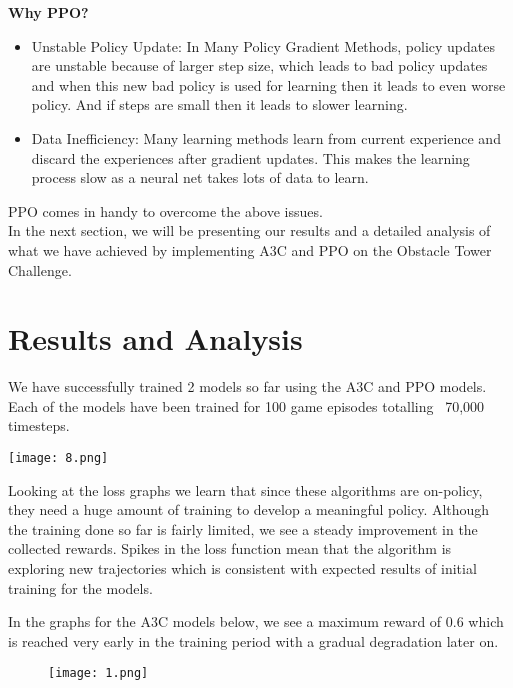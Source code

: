 \documentclass[conference]{IEEEtran}
\begin{document}
\textbf{Why PPO?}\\

\begin{itemize}
\item Unstable Policy Update: In Many Policy Gradient Methods, policy updates are unstable because of larger step size, which leads to bad policy updates and when this new bad policy is used for learning then it leads to even worse policy. And if steps are small then it leads to slower learning. \\
\item Data Inefficiency: Many learning methods learn from current experience and discard the experiences after gradient updates. This makes the learning process slow as a neural net takes lots of data to learn.\\
\end{itemize}

PPO comes in handy to overcome the above issues.\\

In the next section, we will be presenting our results and a detailed analysis of what we have achieved by implementing A3C and PPO on the Obstacle Tower Challenge.

\section{Results and Analysis}

We have successfully trained 2 models so far using the A3C and PPO models. Each of the models have been trained for 100 game episodes totalling ~70,000 timesteps.

\begin{figure*}
  \texttt{[image: 8.png]}
\end{figure*}

Looking at the loss graphs we learn that since these algorithms are on-policy, they need a huge amount of training to develop a meaningful policy. Although the training done so far is fairly limited, we see a steady improvement in the collected rewards. Spikes in the loss function mean that the algorithm is exploring new trajectories which is consistent with expected results of initial training for the models. 

In the graphs for the A3C models below, we see a maximum reward of 0.6 which is reached very early in the training period with a gradual degradation later on. 

\begin{figure}[htp]
    \centering
    \texttt{[image: 1.png]}
\end{figure}
\end{document}
